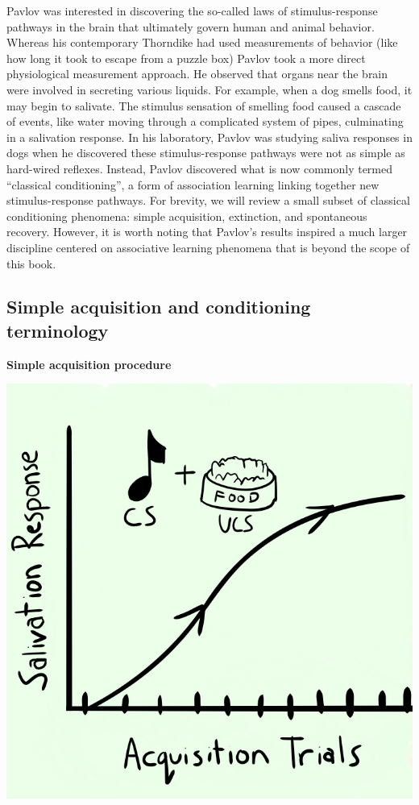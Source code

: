 \documentclass[
  oneside,
  12pt]{crumpbook}
\newenvironment{floatrightbox50}{%
  \wrapfigure{R}{.5\textwidth}%
  }{%
  \endwrapfigure}
\begin{document}
Pavlov was interested in discovering the so-called laws of stimulus-response pathways in the brain that ultimately govern human and animal behavior. Whereas his contemporary Thorndike had used measurements of behavior (like how long it took to escape from a puzzle box) Pavlov took a more direct physiological measurement approach. He observed that organs near the brain were involved in secreting various liquids. For example, when a dog smells food, it may begin to salivate. The stimulus sensation of smelling food caused a cascade of events, like water moving through a complicated system of pipes, culminating in a salivation response. In his laboratory, Pavlov was studying saliva responses in dogs when he discovered these stimulus-response pathways were not as simple as hard-wired reflexes. Instead, Pavlov discovered what is now commonly termed ``classical conditioning'', a form of association learning linking together new stimulus-response pathways. For brevity, we will review a small subset of classical conditioning phenomena: simple acquisition, extinction, and spontaneous recovery. However, it is worth noting that Pavlov's results inspired a much larger discipline centered on associative learning phenomena that is beyond the scope of this book.

\hypertarget{simple-acquisition-and-conditioning-terminology}{%
\subsection{Simple acquisition and conditioning terminology}\label{simple-acquisition-and-conditioning-terminology}}

\begin{floatrightbox50}
\textbf{Simple acquisition procedure}

\includegraphics[width=1\linewidth]{imgs/Conditioning_Acquisition}

\end{floatrightbox50}
\end{document}
